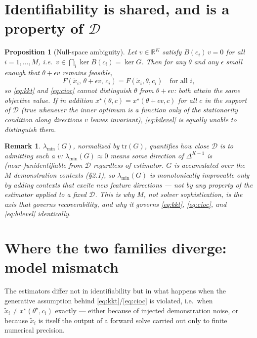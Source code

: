 \documentclass[11pt]{article}
\newtheorem{proposition}{Proposition}
\newtheorem{remark}{Remark}
\newcommand{\R}{\mathbb{R}}
\newcommand{\theovec}{\theta}
\newcommand{\xdemo}{\tilde{x}}
\begin{document}
\section{Identifiability is shared, and is a property of $\mathcal{D}$}

\begin{proposition}[Null-space ambiguity]
Let $v \in \R^K$ satisfy $B(c_i)\, v = 0$ for all $i = 1,\dots,M$, i.e.\
$v \in \bigcap_i \ker B(c_i) = \ker G$. Then for any $\theovec$ and any
$\epsilon$ small enough that $\theovec + \epsilon v$ remains feasible,
\begin{equation}
  F(\xdemo_i,\, \theovec + \epsilon v,\, c_i) = F(\xdemo_i,\theovec,c_i)
  \quad \text{for all } i,
\end{equation}
so \eqref{eq:kkt} and \eqref{eq:cioc} cannot distinguish $\theovec$ from
$\theovec + \epsilon v$: both attain the same objective value. If in addition
$x^\star(\theovec,c) = x^\star(\theovec+\epsilon v, c)$ for all $c$ in the
support of $\mathcal{D}$ (true whenever the inner optimum is a function only
of the stationarity condition along directions $v$ leaves invariant),
\eqref{eq:bilevel} is equally unable to distinguish them.
\end{proposition}

\begin{remark}
$\lambda_{\min}(G)$, normalized by $\mathrm{tr}(G)$, quantifies how close
$\mathcal{D}$ is to admitting such a $v$: $\lambda_{\min}(G) \approx 0$ means
some direction of $\Delta^{K-1}$ is (near-)unidentifiable from $\mathcal{D}$
regardless of estimator. $G$ is accumulated over the $M$ demonstration
contexts (\S2.1), so $\lambda_{\min}(G)$ is monotonically improvable only by
adding contexts that excite new feature directions — not by any property of
the estimator applied to a fixed $\mathcal{D}$. This is why $M$, not solver
sophistication, is the axis that governs recoverability, and why it governs
\eqref{eq:kkt}, \eqref{eq:cioc}, and \eqref{eq:bilevel} identically.
\end{remark}

\section{Where the two families diverge: model mismatch}

The estimators differ not in identifiability but in what happens when the
generative assumption behind \eqref{eq:kkt}/\eqref{eq:cioc} is violated,
i.e.\ when $\xdemo_i \ne x^\star(\theovec^\star, c_i)$ exactly — either
because of injected demonstration noise, or because $\xdemo_i$ is itself the
output of a forward solve carried out only to finite numerical precision.
\end{document}
